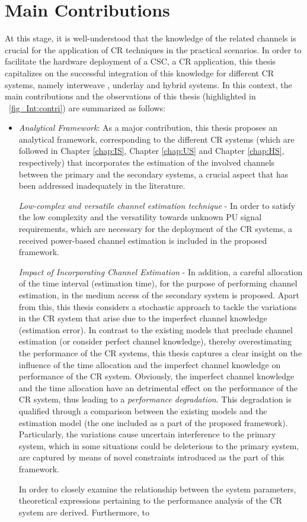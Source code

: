 \section{Main Contributions}
At this stage, it is well-understood that the knowledge of the related channels is crucial for the application of CR techniques in the practical scenarios. In order to facilitate the hardware deployment of a CSC, a CR application, this thesis capitalizes on the successful integration of this knowledge for different CR systems, namely interweave , underlay and hybrid systems. In this context, the main contributions and the observations of this thesis (highlighted in \figurename~\ref{fig_Int:contri}) are summarized as follows:
\begin{itemize}
\item \textit{Analytical Framework}: 
As a major contribution, this thesis proposes an analytical framework, corresponding to the different CR systems (which are followed in Chapter \ref{chap:IS}, Chapter \ref{chap:US} and Chapter \ref{chap:HS}, respectively) that incorporates the estimation of the involved channels between the primary and the secondary systems, a crucial aspect that has been addressed inadequately in the literature. \begin{mdframed}[style=MyFrame] \textit{Low-complex and versatile channel estimation technique} - In order to satisfy the low complexity and the versatility towards unknown PU signal requirements, which are necessary for the deployment of the CR systems, a received power-based channel estimation is included in the proposed framework.\end{mdframed} \begin{mdframed}[style=MyFrame] \textit{Impact of Incorporating Channel Estimation} - In addition, a careful allocation of the time interval (estimation time), for the purpose of performing channel estimation, in the medium access of the secondary system is proposed. Apart from this, this thesis considers a stochastic approach to tackle the variations in the CR system that arise due to the imperfect channel knowledge (estimation error). In contrast to the existing models that preclude channel estimation (or consider perfect channel knowledge), thereby overestimating the performance of the CR systems, this thesis captures a clear insight on the influence of the time allocation and the imperfect channel knowledge on performance of the CR system. Obviously, the imperfect channel knowledge and the time allocation have an detrimental effect on the performance of the CR system, thus leading to a \textit{performance degradation}. This degradation is qualified through a comparison between the existing models and the estimation model (the one included as a part of the proposed framework). Particularly, the variations cause uncertain interference to the primary system, which in some situations could be deleterious to the primary system, are captured by means of novel constraints introduced as the part of this framework. \end{mdframed} In order to closely examine the relationship between the system parameters, theoretical expressions pertaining to the performance analysis of the CR system are derived. Furthermore, to 
\end{itemize}
